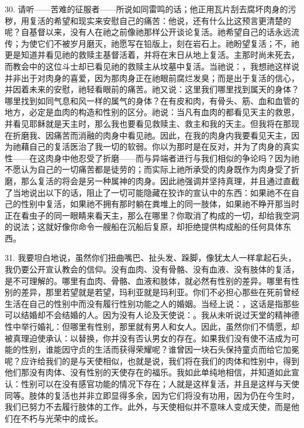 30. 请听——苦难的征服者——所说如同雷鸣的话；他正用瓦片刮去腐坏肉身的污秽，用复活的希望和现实来安慰自己的痛苦：他说，还有什么比这预言更清楚的呢？自基督以来，没有人在祂之前像祂那样公开谈论复活。祂希望自己的话永远流传；为使它们不被岁月磨灭，祂愿写在铅版上，刻在岩石上。祂盼望复活；不，祂更是知道并看见祂的救赎主基督活着，并将在末日从地上复活。主那时尚未死去，而教会中的这位斗士却已看见祂的救赎主从坟墓中复活。当祂说：，我想祂这样说并非出于对肉身的喜爱，因为那肉身正在祂眼前腐烂发臭；而是出于复活的信心，并因着未来的安慰，祂轻看眼前的痛苦。祂又说：这里我们哪里找到属天的身体？哪里找到如同气息和风一样的属气的身体？在有皮和肉，有骨头、筋、血和血管的地方，必定是血肉的构造和性别的区分。祂说：当凡有血肉的都看见天主的救恩，并看见耶稣就是天主时，那么我也要看见救赎主、救主和我的天主。但我将在那现在折磨我、因痛苦而消融的肉身中看见祂。因此，在我的肉身内我要看见天主，因为祂藉自己的复活医治了我一切的软弱。你以为那时是在反对，并为了肉身的真实性——在这肉身中他忍受了折磨——而与异端者进行与我们相似的争论吗？因为祂不愿认为自己的一切痛苦都是徒劳的；而实际上祂所承受的肉身既作为肉身受了折磨，那么复活的将会是另一种属神的肉身。因此祂强调并坚持真理，并且通过直截了当地说出以下的话，阻止了一切可能隐藏在狡诈的宣认中的东西：如果祂不在自己的性别中复活，如果祂不拥有那时躺在粪堆上的同一肢体，如果祂不睁开那当时正在看虫子的同一眼睛来看天主，那么在哪里？你取消了构成的一切，却给我空洞的说法；这就好像你命令一艘船在沉船后复原，却拒绝提供构成船的任何具体东西。\par

31. 我要坦白地说，虽然你们扭曲嘴巴、扯头发、跺脚，像犹太人一样拿起石头，我仍要公开宣认教会的信仰。没有血肉、没有骨骼、没有血液、没有肢体的复活，是不可理解的。哪里有血肉、骨骼、血液和肢体，就必然有性别的差异。哪里有性别的差异，那里若望就是若望，玛利亚就是玛利亚。你们不必担心那些在死前曾经生活在自己的性别中而没有履行性别功能之人的婚姻。当经上说：，这话是指那些可以结婚却不会结婚的人。因为没有人论及天使说：。我从未听说过天堂的精神德性中举行婚礼：但哪里有性别，那里就有男人和女人。因此，虽然你们不情愿，却被真理迫使承认：以替换，你并没有否认男女的存在。如果我们没有使不洁成为可能的性别，谁能因守贞的生活而获得荣耀呢？谁曾因一块石头保持童贞而给它加冕呢？应许给我们的是与天使相似，也就是说，我们将在我们的肉体和性别中，得到他们那没有肉体、没有性别的天使存在的福乐。我如此单纯地相信，并知道如此宣认：性别可以在没有感官功能的情况下存在；人就是这样复活，并且是这样与天使同等。肢体的复活也并非立即显得多余，因为它们将没有功用，因为仍在今生时，我们已努力不去履行肢体的工作。此外，与天使相似并不意味人变成天使，而是他们在不朽与光荣中的成长。\par

